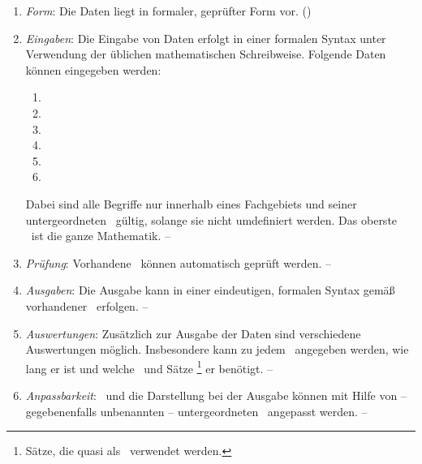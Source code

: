 %
\begin{enumerate}

	\item \label{Anforderung:Form} \emph{Form}:
	Die Daten liegt in formaler, geprüfter Form vor.
	()

	\item \label{Anforderung:Eingaben} \emph{Eingaben}:
	Die Eingabe von Daten erfolgt in einer formalen Syntax unter Verwendung der üblichen mathematischen Schreibweise.
	Folgende Daten können eingegeben werden:
	\begin{enumerate}
		\item \Axiome
		\item \Saetze
		\item \Beweise
		\item \Fachbegriffe
		\item \Fachgebiete
		\item \Ausgabeschemata
	\end{enumerate}
	Dabei sind alle Begriffe nur innerhalb eines Fachgebiets und seiner untergeordneten \Fachgebiete\ gültig, solange sie nicht umdefiniert werden.
	Das oberste \Fachgebiet\ ist die ganze Mathematik.
	-- 

	\item \label{Anforderung:Prüfung} \emph{Prüfung}:
	Vorhandene \Beweise\ können automatisch geprüft werden.
	-- 

	\item \label{Anforderung:Ausgaben} \emph{Ausgaben}:
	Die Ausgabe kann in einer eindeutigen, formalen Syntax gemäß vorhandener \Ausgabeschemata\ erfolgen.
	-- 

	\item \label{Anforderung:Auswertungen} \emph{Auswertungen}:
	Zusätzlich zur Ausgabe der Daten sind verschiedene Auswertungen möglich.
	Insbesondere kann zu jedem \Beweis\ angegeben werden, wie lang er ist und welche \Axiome\ und Sätze%
	\footnote{Sätze, die quasi als \Axiome\ verwendet werden.}
	er benötigt.
	-- 

	\item \label{Anforderung:Anpassbarkeit} \emph{Anpassbarkeit}:
	\Fachbegriffe\ und die Darstellung bei der Ausgabe können mit Hilfe von -- gegebenenfalls unbenannten -- untergeordneten \Fachgebieten\ angepasst werden.
	-- 


\end{enumerate}
